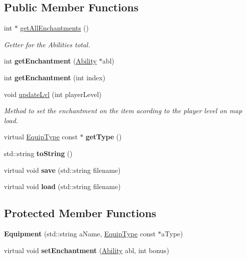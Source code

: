 \subsection*{Public Member Functions}
\begin{DoxyCompactItemize}
\item 
int $\ast$ \hyperlink{class_equipment_a9e2505f187dadc04a811a9d0680d29cf}{get\+All\+Enchantments} ()
\begin{DoxyCompactList}\small\item\em Getter for the Abilities total. \end{DoxyCompactList}\item 
\hypertarget{class_equipment_a562d37bd3587b738c13c262650cf8489}{}\label{class_equipment_a562d37bd3587b738c13c262650cf8489} 
int {\bfseries get\+Enchantment} (\hyperlink{class_ability}{Ability} $\ast$abl)
\item 
\hypertarget{class_equipment_a476657aab86ed7d26a97aa77454f7ac3}{}\label{class_equipment_a476657aab86ed7d26a97aa77454f7ac3} 
int {\bfseries get\+Enchantment} (int index)
\item 
void \hyperlink{class_equipment_ab56d6a16b2151d7793c4b5fddde1f145}{update\+Lvl} (int player\+Level)
\begin{DoxyCompactList}\small\item\em Method to set the enchantment on the item acording to the player level on map load. \end{DoxyCompactList}\item 
\hypertarget{class_equipment_a274e31858324c1774dd022315ee056a9}{}\label{class_equipment_a274e31858324c1774dd022315ee056a9} 
virtual \hyperlink{class_equip_type}{Equip\+Type} const  $\ast$ {\bfseries get\+Type} ()
\item 
\hypertarget{class_equipment_a66ae3c2ca283f3788abbd61b45ee5077}{}\label{class_equipment_a66ae3c2ca283f3788abbd61b45ee5077} 
std\+::string {\bfseries to\+String} ()
\item 
\hypertarget{class_equipment_ac534ea06d524c524201e359f54938146}{}\label{class_equipment_ac534ea06d524c524201e359f54938146} 
virtual void {\bfseries save} (std\+::string filename)
\item 
\hypertarget{class_equipment_ac07ac998f85529e90bd209b32c89809d}{}\label{class_equipment_ac07ac998f85529e90bd209b32c89809d} 
virtual void {\bfseries load} (std\+::string filename)
\end{DoxyCompactItemize}
\subsection*{Protected Member Functions}
\begin{DoxyCompactItemize}
\item 
\hypertarget{class_equipment_ab98d0ccbf2f89274a0c4aa9d4763e35c}{}\label{class_equipment_ab98d0ccbf2f89274a0c4aa9d4763e35c} 
{\bfseries Equipment} (std\+::string a\+Name, \hyperlink{class_equip_type}{Equip\+Type} const $\ast$a\+Type)
\item 
\hypertarget{class_equipment_ac6946f620ba8e13c3dfd039d4c604f09}{}\label{class_equipment_ac6946f620ba8e13c3dfd039d4c604f09} 
virtual void {\bfseries set\+Enchantment} (\hyperlink{class_ability}{Ability} abl, int bonus)
\end{DoxyCompactItemize}
